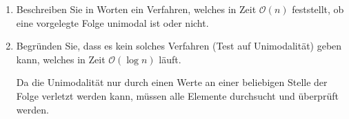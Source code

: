 \documentclass{bschlangaul-aufgabe}
\begin{document}
\begin{enumerate}
\begin{bAntwort}


\end{bAntwort}


\item Beschreiben Sie in Worten ein Verfahren, welches in Zeit
$\mathcal{O}(n)$ feststellt, ob eine vorgelegte Folge unimodal ist oder
nicht.

\begin{bAntwort}
\end{bAntwort}


\item Begründen Sie, dass es kein solches Verfahren (Test auf
Unimodalität) geben kann, welches in Zeit $\mathcal{O}(\log n)$ läuft.

\begin{bAntwort}
Da die Unimodalität nur durch einen Werte an einer beliebigen Stelle der
Folge verletzt werden kann, müssen alle Elemente durchsucht und
überprüft werden.
\end{bAntwort}
\end{enumerate}

\begin{bAntwort}


\end{bAntwort}
\end{document}

